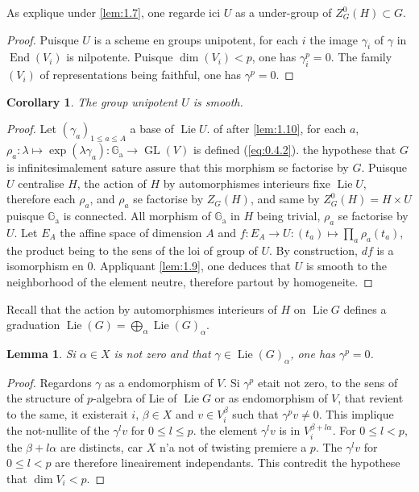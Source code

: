 \documentclass[11pt,a4paper]{article}
\theoremstyle{plain}
\newtheorem{lemma}[theorem]{Lemma}
\newtheorem{corollary}[theorem]{Corollary}
\theoremstyle{definition}
\DeclareMathOperator{\End}{End}
\DeclareMathOperator{\Lie}{Lie}
\DeclareMathOperator{\GL}{GL}
\newcommand{\Ga}{\mathbb{G}_\mathrm{a}}
\begin{document}
As explique under \ref{lem:1.7}, one regarde ici $U$ as a under-group of $Z^0_G(H) \subset G$.

\begin{proof}
Puisque $U$ is a scheme en groups unipotent, for each $i$ the image $\gamma_i$ of $\gamma$ in $\End(V_i)$ is nilpotente. Puisque $\dim(V_i) < p$, one has $\gamma_i^p = 0$. The family $(V_i)$ of representations being faithful, one has $\gamma^p = 0$.
\end{proof}

\begin{corollary}\label{cor:1.11}
The group unipotent $U$ is smooth.
\end{corollary}

\begin{proof}
Let $(\gamma_a)_{1 \leq a \leq A}$ a base of $\Lie U$. of after \ref{lem:1.10}, for each $a$, $\rho_a: \lambda \mapsto \exp(\lambda\gamma_a): \Ga \to \GL(V)$ is defined (\ref{eq:0.4.2}). the hypothese that $G$ is infinitesimalement sature assure that this morphism se factorise by $G$. Puisque $U$ centralise $H$, the action of $H$ by automorphismes interieurs fixe $\Lie U$, therefore each $\rho_a$, and $\rho_a$ se factorise by $Z_G(H)$, and same by $Z^0_G(H) = H \times U$ puisque $\Ga$ is connected. All morphism of $\Ga$ in $H$ being trivial, $\rho_a$ se factorise by $U$. Let $E_A$ the affine space of dimension $A$ and $f: E_A \to U: (t_a) \mapsto \prod_a \rho_a(t_a)$, the product being to the sens of the loi of group of $U$. By construction, $df$ is a isomorphism en $0$. Appliquant \ref{lem:1.9}, one deduces that $U$ is smooth to the neighborhood of the element neutre, therefore partout by homogeneite.
\end{proof}

Recall that the action by automorphismes interieurs of $H$ on $\Lie G$ defines a graduation $\Lie(G) = \bigoplus_\alpha \Lie(G)_\alpha$.

\begin{lemma}\label{lem:1.12}
Si $\alpha \in X$ is not zero and that $\gamma \in \Lie(G)_\alpha$, one has $\gamma^p = 0$.
\end{lemma}

\begin{proof}
Regardons $\gamma$ as a endomorphism of $V$. Si $\gamma^p$ etait not zero, to the sens of the structure of $p$-algebra of Lie of $\Lie G$ or as endomorphism of $V$, that revient to the same, it existerait $i$, $\beta \in X$ and $v \in V_i^\beta$ such that $\gamma^p v \neq 0$. This implique the not-nullite of the $\gamma^l v$ for $0 \leq l \leq p$. the element $\gamma^l v$ is in $V_i^{\beta + l\alpha}$. For $0 \leq l < p$, the $\beta + l\alpha$ are distincts, car $X$ n'a not of twisting premiere a $p$. The $\gamma^l v$ for $0 \leq l < p$ are therefore lineairement independants. This contredit the hypothese that $\dim V_i < p$.
\end{proof}
\end{document}
